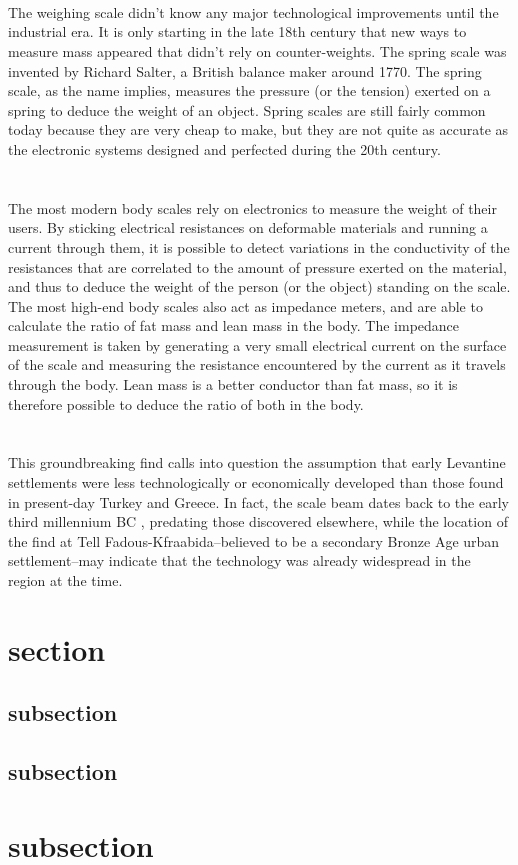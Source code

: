 \\
\\
\\
The weighing scale didn’t know any major technological improvements until the industrial era. It is only starting in the late 18th century that new ways to measure mass appeared that didn’t rely on counter-weights. The spring scale was invented by Richard Salter, a British balance maker around 1770. The spring scale, as the name implies, measures the pressure (or the tension) exerted on a spring to deduce the weight of an object. Spring scales are still fairly common today because they are very cheap to make, but they are not quite as accurate as the electronic systems designed and perfected during the 20th century.
\\
\\
\\

The most modern body scales rely on electronics to measure the weight of their users. By sticking electrical resistances on deformable materials and running a current through them, it is possible to detect variations in the conductivity of the resistances that are correlated to the amount of pressure exerted on the material, and thus to deduce the weight of the person (or the object) standing on the scale. The most high-end body scales also act as impedance meters, and are able to calculate the ratio of fat mass and lean mass in the body. The impedance measurement is taken by generating a very small electrical current on the surface of the scale and measuring the resistance encountered by the current as it travels through the body. Lean mass is a better conductor than fat mass, so it is therefore possible to deduce the ratio of both in the body.
\\
\\
\\

This groundbreaking find calls into question the assumption that early Levantine settlements were less technologically or economically developed than those found in present-day Turkey and Greece. In fact, the scale beam dates back to the early third millennium BC , predating those discovered elsewhere, while the location of the find at Tell Fadous-Kfraabida–believed to be a secondary Bronze Age urban settlement–may indicate that the technology was already widespread in the region at the time.

\section{section}
\subsection{subsection}
\subsection{subsection}
\section{subsection}
